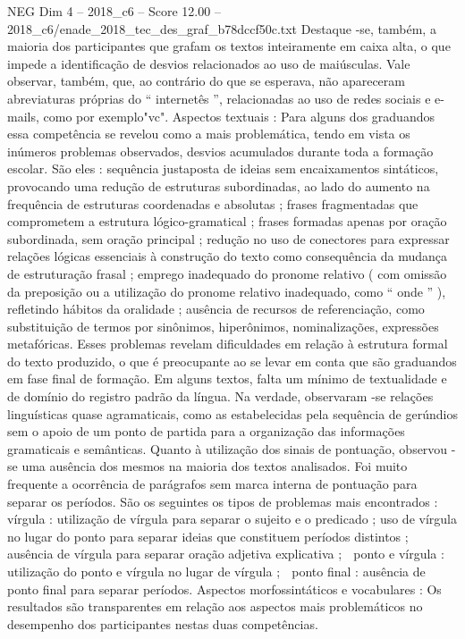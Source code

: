 \begin{textsample}{NEG Dim 4 – 2018\_c6 – Score 12.00 – 2018\_c6/enade\_2018\_tec\_des\_graf\_b78dccf50c.txt}
Destaque -se, também, a maioria dos participantes que grafam os textos inteiramente em caixa alta, o que impede a identificação de desvios relacionados ao uso de maiúsculas.
Vale observar, também, que, ao contrário do que se esperava, não apareceram abreviaturas próprias do “ internetês ”, relacionadas ao uso de redes sociais e e-mails, como por exemplo"vc".
Aspectos textuais : Para alguns dos graduandos essa competência se revelou como a mais problemática, tendo em vista os inúmeros problemas observados, desvios acumulados durante toda a formação escolar.
São eles : sequência justaposta de ideias sem encaixamentos sintáticos, provocando uma redução de estruturas subordinadas, ao lado do aumento na frequência de estruturas coordenadas e absolutas ; frases fragmentadas que comprometem a estrutura lógico-gramatical ; frases formadas apenas por oração subordinada, sem oração principal ; redução no uso de conectores para expressar relações lógicas essenciais à construção do texto como consequência da mudança de estruturação frasal ; emprego inadequado do pronome relativo ( com omissão da preposição ou a utilização do pronome relativo inadequado, como “ onde ” ), refletindo hábitos da oralidade ; ausência de recursos de referenciação, como substituição de termos por sinônimos, hiperônimos, nominalizações, expressões metafóricas.
Esses problemas revelam dificuldades em relação à estrutura formal do texto produzido, o que é preocupante ao se levar em conta que são graduandos em fase final de formação.
Em alguns textos, falta um mínimo de textualidade e de domínio do registro padrão da língua.
Na verdade, observaram -se relações linguísticas quase agramaticais, como as estabelecidas pela sequência de gerúndios sem o apoio de um ponto de partida para a organização das informações gramaticais e semânticas.
Quanto à utilização dos sinais de pontuação, observou -se uma ausência dos mesmos na maioria dos textos analisados.
Foi muito frequente a ocorrência de parágrafos sem marca interna de pontuação para separar os períodos.
São os seguintes os tipos de problemas mais encontrados :  vírgula : utilização de vírgula para separar o sujeito e o predicado ; uso de vírgula no lugar do ponto para separar ideias que constituem períodos distintos ; ausência de vírgula para separar oração adjetiva explicativa ;  ponto e vírgula : utilização do ponto e vírgula no lugar de vírgula ;  ponto final : ausência de ponto final para separar períodos.
Aspectos morfossintáticos e vocabulares : Os resultados são transparentes em relação aos aspectos mais problemáticos no desempenho dos participantes nestas duas competências.

\end{textsample}

